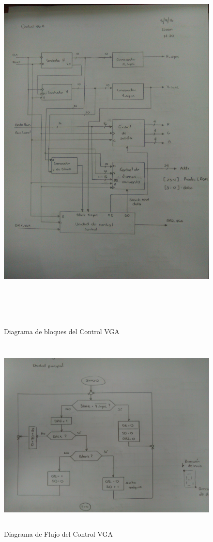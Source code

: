 \documentclass[12pt,a4paper]{report}
\begin{document}
\begin{figure}[hbtp]
	\centering
	\includegraphics[width=16cm,height=20cm]{Img/ControlVGABloques.jpg}
	\caption{Diagrama de bloques del Control VGA}
	\label{fig:BloquesVGA1}
\end{figure}

\begin{figure}[hbtp]
	\centering
	\includegraphics[width=15cm,height=10cm]{Img/ControlVGAFlujo.jpg}
	\caption{Diagrama de Flujo del Control VGA}
	\label{fig:FlujoVGA1}
\end{figure}
\end{document}
